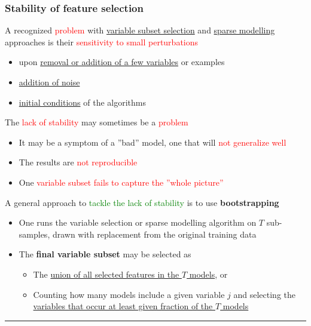 \documentclass[12pt, a4paper]{article}
\begin{document}
\subsubsection{Stability of feature selection}\label{stability-of-feature-selection}

A recognized \textcolor{red}{problem} with \uline{variable subset selection} and \uline{sparse modelling} approaches is their \textcolor{red}{sensitivity to small perturbations}

\begin{itemize}
  \item upon \uline{removal or addition of a few variables} or examples
  \item \uline{addition of noise}
  \item \uline{initial conditions} of the algorithms
\end{itemize}

The \textcolor{red}{lack of stability} may sometimes be a \textcolor{red}{problem}

\begin{itemize}
  \item It may be a symptom of a ”bad” model, one that will \textcolor{red}{not generalize well}
  \item The results are \textcolor{red}{not reproducible}
  \item One \textcolor{red}{variable subset fails to capture the ”whole picture”}
\end{itemize}

A general approach to \textcolor{Green}{tackle the lack of stability} is to use \textbf{bootstrapping}
\begin{itemize}
  \item One runs the variable selection or sparse modelling algorithm on $T$ sub-samples, drawn with replacement from the original training data
  \item The \textbf{final variable subset} may be selected as
  \begin{itemize}
    \item The \uline{union of all selected features in the $T$ models}, or
    \item Counting how many models include a given variable $j$ and selecting the \uline{variables that occur at least given fraction of the $T$ models}
  \end{itemize}
\end{itemize}




\begin{center}\rule{3in}{0.4pt}\end{center}
\end{document}
